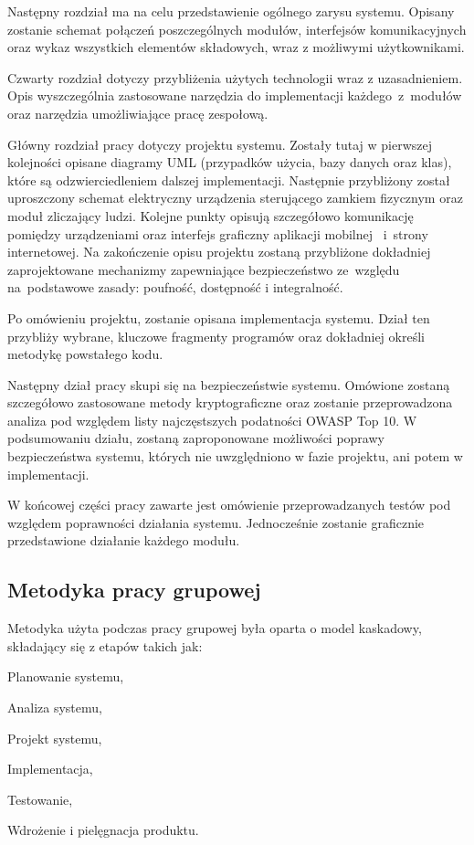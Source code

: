 \documentclass[twoside,10pt]{article}
\begin{document}
Następny rozdział ma na celu przedstawienie ogólnego zarysu systemu. Opisany zostanie schemat połączeń poszczególnych modułów, interfejsów komunikacyjnych oraz wykaz wszystkich elementów składowych, wraz z możliwymi użytkownikami.

Czwarty rozdział dotyczy przybliżenia użytych technologii wraz z uzasadnieniem. Opis wyszczególnia zastosowane narzędzia do implementacji każdego~z~modułów oraz narzędzia umożliwiające pracę zespołową.

Główny rozdział pracy dotyczy projektu systemu. Zostały tutaj w pierwszej kolejności opisane diagramy UML (przypadków użycia, bazy danych oraz klas), które są odzwierciedleniem dalszej implementacji. Następnie przybliżony został uproszczony schemat elektryczny urządzenia sterującego zamkiem fizycznym oraz moduł zliczający ludzi. Kolejne punkty opisują szczegółowo komunikację pomiędzy urządzeniami oraz interfejs graficzny aplikacji mobilnej ~i~strony internetowej. Na zakończenie opisu projektu zostaną przybliżone dokładniej zaprojektowane mechanizmy zapewniające bezpieczeństwo ze~względu na~podstawowe zasady: poufność, dostępność i integralność.

Po omówieniu projektu, zostanie opisana implementacja systemu. Dział ten przybliży wybrane, kluczowe fragmenty programów oraz dokładniej określi metodykę powstałego kodu. 

Następny dział pracy skupi się na bezpieczeństwie systemu. Omówione zostaną szczegółowo zastosowane metody kryptograficzne oraz zostanie przeprowadzona analiza pod względem listy najczęstszych podatności OWASP Top 10. W podsumowaniu działu, zostaną zaproponowane możliwości poprawy  bezpieczeństwa systemu, których nie uwzględniono w fazie projektu, ani potem w implementacji.

W końcowej części pracy zawarte jest omówienie przeprowadzanych testów pod względem poprawności działania systemu. Jednocześnie zostanie graficznie przedstawione działanie każdego modułu.

\subsection{Metodyka pracy grupowej}
Metodyka użyta podczas pracy grupowej była oparta o model kaskadowy, składający się z etapów takich jak:
\begin{itemize*}
\item Planowanie systemu,
\item Analiza systemu,
\item Projekt systemu,
\item Implementacja,
\item Testowanie,
\item Wdrożenie i pielęgnacja produktu.
\end{itemize*}
\end{document}
